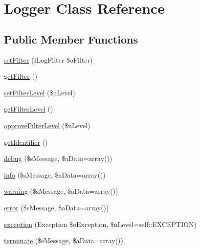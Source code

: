 \hypertarget{class_logger}{\section{Logger Class Reference}
\label{class_logger}
}
\subsection*{Public Member Functions}
\begin{DoxyCompactItemize}
\item 
\hyperlink{class_logger_a54e5e4ead59460c6345d38ed4385e3fc}{set\-Filter} (I\-Log\-Filter \$o\-Filter)
\item 
\hyperlink{class_logger_a71d1988b4a05424766640f00cc0c5ec4}{get\-Filter} ()
\item 
\hyperlink{class_logger_ad960882fc5dd94fe18c9d0417c3985f2}{set\-Filter\-Level} (\$n\-Level)
\item 
\hyperlink{class_logger_aaffe36d440a09bceb9f27f7667fd7625}{get\-Filter\-Level} ()
\item 
\hyperlink{class_logger_abd297d3ef221a659a8d045a32d068959}{approve\-Filter\-Level} (\$n\-Level)
\item 
\hyperlink{class_logger_a4048fbdd126bfa83c8055b56647c226e}{get\-Identifier} ()
\item 
\hyperlink{class_logger_ad978807155d0ef809516b07e6a9c8038}{debug} (\$s\-Message, \$a\-Data=array())
\item 
\hyperlink{class_logger_a7f5530064ae6bc2f1cc65c602e0d817b}{info} (\$s\-Message, \$a\-Data=array())
\item 
\hyperlink{class_logger_ae7113cceb70aca732f04eb561ca46234}{warning} (\$s\-Message, \$a\-Data=array())
\item 
\hyperlink{class_logger_a72684fdf8f0b376067092d448c627b41}{error} (\$s\-Message, \$a\-Data=array())
\item 
\hyperlink{class_logger_a85d8fbfdc80c0dfb4217bd465902e579}{exception} (Exception \$o\-Exception, \$n\-Level=self\-::\-E\-X\-C\-E\-P\-T\-I\-O\-N)
\item 
\hyperlink{class_logger_ad2c4a0987a107ccdfe2676d5c7daa0c6}{terminate} (\$s\-Message, \$a\-Data=array())
\end{DoxyCompactItemize}
